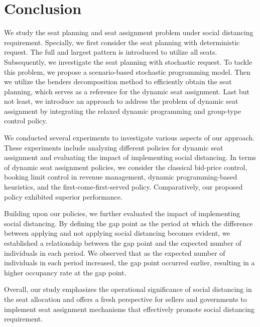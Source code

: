 \section{Conclusion}
We study the seat planning and seat assignment problem under social distancing requirement. 
Specially, we first consider the seat planning with deterministic request. The full and largest pattern is introduced to utilize all seats. Subsequently, we investigate the seat planning with stochastic request. To tackle this problem, we propose a scenario-based stochastic programming model. 
Then we utilize the benders decomposition method to efficiently obtain the seat planning, which serves as a reference for the dynamic seat assignment. Last but not least, we introduce an approach to address the problem of dynamic seat assignment by integrating the relaxed dynamic programming and group-type control policy. 


We conducted several experiments to investigate various aspects of our approach. These experiments include analyzing different policies for dynamic seat assignment and evaluating the impact of implementing social distancing. In terms of dynamic seat assignment policies, we consider the classical bid-price control, booking limit control in revenue management, dynamic programming-based heuristics, and the first-come-first-served policy. Comparatively, our proposed policy exhibited superior performance.

Building upon our policies, we further evaluated the impact of implementing social distancing. By defining the gap point as the period at which the difference between applying and not applying social distancing becomes evident, we established a relationship between the gap point and the expected number of individuals in each period. We observed that as the expected number of individuals in each period increased, the gap point occurred earlier, resulting in a higher occupancy rate at the gap point.


Overall, our study emphasizes the operational significance of social distancing in the seat allocation and offers a fresh perspective for sellers and governments to implement seat assignment mechanisms that effectively promote social distancing requirement.
